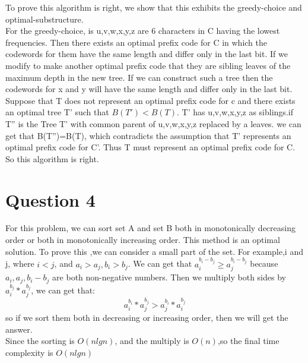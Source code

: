 \documentclass[paper=a4, fontsize=11pt]{scrartcl} %
\numberwithin{equation}{section} %
\numberwithin{figure}{section} %
\numberwithin{table}{section} %
\begin{document}
To prove this algorithm is right, we show that this exhibits the greedy-choice and optimal-substructure.\\
For the greedy-choice, is u,v,w,x,y,z are 6 characters in C having the lowest frequencies. Then there exists an optimal prefix code for C in which the codewords for them have the same length and differ only in the last bit. If we modify to make another optimal prefix code that they are sibling leaves of the maximum depth in the new tree. If we can construct such a tree then the codewords for x and y will have the same length and differ only in the last bit.\\
Suppose that T does not represent an optimal prefix code for c and there exists an optimal tree T' such that $B(T')<B(T)$. T' has u,v,w,x,y,z as siblings.if T'' is the Tree T' with common parent of u,v,w,x,y,z replaced by a leaves. we can get that B(T'')=B(T), which contradicts the assumption that T' represents an optimal prefix code for C'. Thus T must represent an optimal prefix code for C.\\
So this algorithm is right.\\


\vspace{2cm}
\section{\textbf{Question 4}}
For this problem, we can sort set A and set B both in monotonically decreasing order or both in monotonically increasing order. This method is an optimal solution. To prove this ,we can consider a small part of the set. For example,i and j, where $i<j$, and $a_i>a_j, b_i>b_j$. We can get that $a_i^{b_i-b_j}\geq a_j^{b_i-b_j}$ because $a_i, a_j, b_i-b_j$ are both non-negative numbers. Then we multiply both sides by $a_i^{b_j}*a_j^{b_j}$, we can get that: $$a_i^{b_i}*a_j^{b_j}>a_j^{b_i}*a_i^{b_j}$$ so if we sort them both in decreasing or increasing order, then we will get the answer.\\
Since the sorting is $O(nlgn)$, and the multiply is $O(n)$,so the final time complexity is $O(nlgn)$\\


\vspace{2cm}
\end{document}
